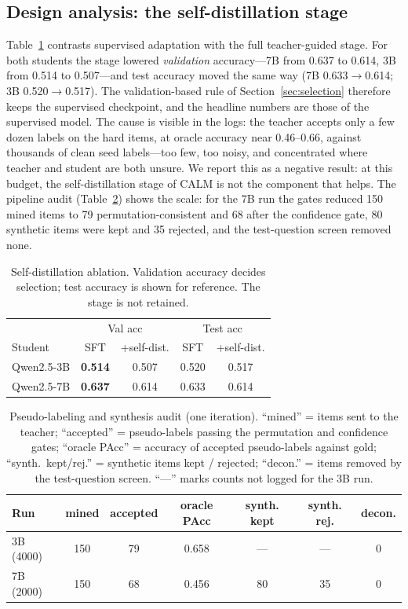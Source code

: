 \documentclass[conference]{IEEEtran}
\begin{document}
\subsection{Design analysis: the self-distillation stage}
Table~\ref{tab:abl} contrasts supervised adaptation with the full teacher-guided stage. For both students the stage lowered \emph{validation} accuracy---7B from 0.637 to 0.614, 3B from 0.514 to 0.507---and test accuracy moved the same way (7B 0.633$\to$0.614; 3B 0.520$\to$0.517). The validation-based rule of Section~\ref{sec:selection} therefore keeps the supervised checkpoint, and the headline numbers are those of the supervised model. The cause is visible in the logs: the teacher accepts only a few dozen labels on the hard items, at oracle accuracy near 0.46--0.66, against thousands of clean seed labels---too few, too noisy, and concentrated where teacher and student are both unsure. We report this as a negative result: at this budget, the self-distillation stage of CALM is not the component that helps. The pipeline audit (Table~\ref{tab:audit}) shows the scale: for the 7B run the gates reduced 150 mined items to 79 permutation-consistent and 68 after the confidence gate, 80 synthetic items were kept and 35 rejected, and the test-question screen removed none.

\begin{table}[tb]
\caption{Self-distillation ablation. Validation accuracy decides selection; test accuracy is shown for reference. The stage is not retained.}
\label{tab:abl}
\centering
\small
\setlength{\tabcolsep}{3.5pt}
\begin{tabular}{@{}lcccc@{}}
\toprule
 & \multicolumn{2}{c}{Val acc} & \multicolumn{2}{c}{Test acc} \\
Student & SFT & +self-dist. & SFT & +self-dist. \\
\midrule
Qwen2.5-3B & \textbf{0.514} & 0.507 & 0.520 & 0.517 \\
Qwen2.5-7B & \textbf{0.637} & 0.614 & 0.633 & 0.614 \\
\bottomrule
\end{tabular}
\end{table}

\begin{table}[tb]
\caption{Pseudo-labeling and synthesis audit (one iteration). ``mined'' = items sent to the teacher; ``accepted'' = pseudo-labels passing the permutation and confidence gates; ``oracle PAcc'' = accuracy of accepted pseudo-labels against gold; ``synth.\ kept/rej.'' = synthetic items kept / rejected; ``decon.'' = items removed by the test-question screen. ``---'' marks counts not logged for the 3B run.}
\label{tab:audit}
\centering
\small
\setlength{\tabcolsep}{4pt}
\begin{tabular}{@{}lcccccc@{}}
\toprule
Run & mined & accepted & oracle PAcc & synth. kept & synth. rej. & decon. \\
\midrule
3B (4000) & 150 & 79 & 0.658 & --- & --- & 0 \\
7B (2000) & 150 & 68 & 0.456 & 80 & 35 & 0 \\
\bottomrule
\end{tabular}
\end{table}
\end{document}
